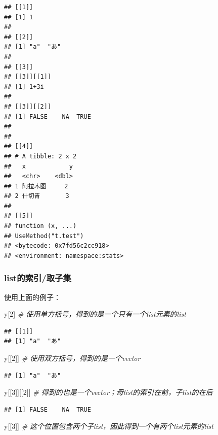 \documentclass[]{book}
\newenvironment{Shaded}{\begin{snugshade}}{\end{snugshade}}
\newcommand{\CommentTok}[1]{\textcolor[rgb]{0.56,0.35,0.01}{\textit{#1}}}
\newcommand{\DecValTok}[1]{\textcolor[rgb]{0.00,0.00,0.81}{#1}}
\newcommand{\NormalTok}[1]{#1}
\begin{document}
\begin{verbatim}
## [[1]]
## [1] 1
## 
## [[2]]
## [1] "a"  "あ"
## 
## [[3]]
## [[3]][[1]]
## [1] 1+3i
## 
## [[3]][[2]]
## [1] FALSE    NA  TRUE
## 
## 
## [[4]]
## # A tibble: 2 x 2
##   x            y
##   <chr>    <dbl>
## 1 阿拉木图     2
## 2 什切青       3
## 
## [[5]]
## function (x, ...) 
## UseMethod("t.test")
## <bytecode: 0x7fd56c2cc918>
## <environment: namespace:stats>
\end{verbatim}

\hypertarget{list}{%
\subsubsection{list的索引/取子集}\label{list}}

使用上面的例子：

\begin{Shaded}
\begin{Highlighting}[]
\NormalTok{y[}\DecValTok{2}\NormalTok{] }\CommentTok{# 使用单方括号，得到的是一个只有一个list元素的list}
\end{Highlighting}
\end{Shaded}

\begin{verbatim}
## [[1]]
## [1] "a"  "あ"
\end{verbatim}

\begin{Shaded}
\begin{Highlighting}[]
\NormalTok{y[[}\DecValTok{2}\NormalTok{]] }\CommentTok{# 使用双方括号，得到的是一个vector}
\end{Highlighting}
\end{Shaded}

\begin{verbatim}
## [1] "a"  "あ"
\end{verbatim}

\begin{Shaded}
\begin{Highlighting}[]
\NormalTok{y[[}\DecValTok{3}\NormalTok{]][[}\DecValTok{2}\NormalTok{]] }\CommentTok{# 得到的也是一个vector；母list的索引在前，子list的在后}
\end{Highlighting}
\end{Shaded}

\begin{verbatim}
## [1] FALSE    NA  TRUE
\end{verbatim}

\begin{Shaded}
\begin{Highlighting}[]
\NormalTok{y[[}\DecValTok{3}\NormalTok{]] }\CommentTok{# 这个位置包含两个子list，因此得到一个有两个list元素的list}
\end{Highlighting}
\end{Shaded}
\end{document}

